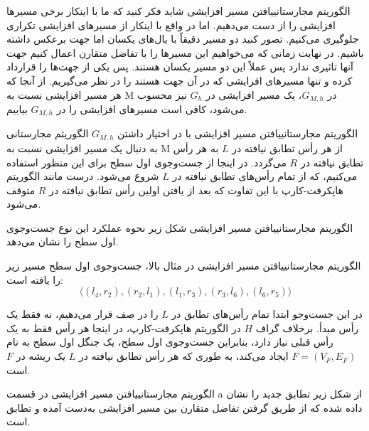 \begin{itemframe-s}{الگوریتم مجارستانی}{یافتن مسیر افزایشی}
\itm
شاید فکر کنید که ما با اینکار برخی مسیرها افزایشی را از دست می‌دهیم. اما در واقع با اینکار از مسیرهای افزایشی تکراری جلوگیری می‌کنیم.
\itm
تصور کنید دو مسیر دقیقاً با یال‌های یکسان اما جهت برعکس داشته باشیم. در نهایت زمانی که می‌خواهیم این مسیرها را با تفاضل متقارن اعمال کنیم جهت آنها تاثیری ندارد پس عملاً این دو مسیر یکسان هستند. پس یکی از جهت‌ها را قرارداد کرده و تنها مسیرهای افزایشی که در آن جهت هستند را در نظر می‌گیریم.
\itm
از آنجا که هر مسیر افزایشی نسبت به M در $G_{M,h}$، یک مسیر افزایشی در $G_h$ نیز محسوب می‌شود، کافی است مسیرهای افزایشی را در $G_{M,h}$ بیابیم.
\end{itemframe-s}


\begin{itemframe-s}{الگوریتم مجارستانی}{یافتن مسیر افزایشی}
\itm
با در اختیار داشتن $G_{M,h}$ الگوریتم مجارستانی به دنبال یک مسیر افزایشی نسبت به M از هر رأس تطابق نیافته در $L$ به هر رأس تطابق نیافته در $R$ می‌گردد.
\itm
در اینجا از جست‌وجوی اول سطح برای این منظور استفاده می‌کنیم، که از تمام رأس‌های تطابق نیافته در $L$ شروع می‌شود. درست مانند الگوریتم هاپکرفت-کارپ با این تفاوت که بعد از یافتن اولین رأس تطابق نیافته در $R$ متوقف می‌شود.
\end{itemframe-s}


\begin{itemframe-s}{الگوریتم مجارستانی}{یافتن مسیر افزایشی}
\itm
شکل زیر نحوه عملکرد این نوع جست‌وجوی اول سطح را نشان می‌دهد.
\end{itemframe-s}


\begin{itemframe-s}{الگوریتم مجارستانی}{یافتن مسیر افزایشی}
\itm
در مثال بالا، جست‌وجوی اول سطح مسیر زیر را یافته است:
$$
\langle (l_4, r_2), (r_2, l_1), (l_1, r_3), (r_3, l_6), (l_6, r_5) \rangle
$$

\itm
در این جست‌وجو ابتدا تمام رأس‌های تطابق در $L$ را در صف قرار می‌دهیم، نه فقط یک رأس مبدأ.
\itm
برخلاف گراف $H$ در الگوریتم هاپکرفت-کارپ، در اینجا هر رأس فقط به یک رأس قبلی نیاز دارد، بنابراین جست‌وجوی اول سطح، یک جنگل اول سطح
به نام $F = (V_F, E_F)$ ایجاد می‌کند، به طوری که هر رأس تطابق نیافته در $L$ یک ریشه در $F$ است.
\end{itemframe-s}


\begin{itemframe-s}{الگوریتم مجارستانی}{یافتن مسیر افزایشی}
\itm
در قسمت a از شکل زیر تطابق جدید را نشان داده شده که از طریق گرفتن تفاضل متقارن بین مسیر افزایشی به‌دست آمده و تطابق است.
\end{itemframe-s}


